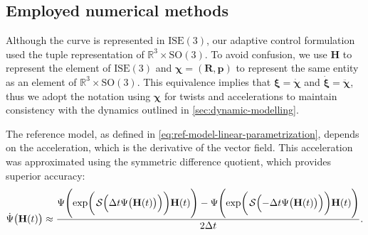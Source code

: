 \subsection{Employed numerical methods}\label{sec:results-adaptive-nummerical-methods}
Although the curve is represented in $\text{ISE}(3)$, our adaptive control formulation used the tuple representation of $\mathbb{R}^3\times \text{SO}(3)$. To avoid confusion, we use $\mathbf{H}$ to represent the element of $\text{ISE}(3)$ and $\boldsymbol{\chi}=(\mathbf{R}, \mathbf{p})$ to represent the same entity as an element of $\mathbb{R}^3\times \text{SO}(3)$. This equivalence implies that $\boldsymbol{\xi}=\dot{\boldsymbol{\chi}}$ and $\dot{\boldsymbol{\xi}} = \ddot{\boldsymbol{\chi}}$, thus we adopt the notation using $\boldsymbol{\chi}$ for twists and accelerations to maintain consistency with the dynamics outlined in \cref{sec:dynamic-modelling}.

The reference model, as defined in \eqref{eq:ref-model-linear-parametrization}, depends on the acceleration, which is the derivative of the vector field. This acceleration was approximated using the symmetric difference quotient, which provides superior accuracy: 
\begin{align}
    \dot{\Psi}\bigl(\mathbf{H}(t)\bigr) \approx \frac{\Psi\Biggl(\exp\biggl(\SL\Bigl(\Delta t\Psi\bigl(\mathbf{H}(t)\bigr)\Bigr)\biggr)\mathbf{H}(t)\Biggr) - \Psi\Biggl(\exp\biggl(\SL\Bigl(-\Delta t\Psi\bigl(\mathbf{H}(t)\bigr)\Bigr)\biggr)\mathbf{H}(t)\Biggr)}{2\Delta t}. \label{eq:approximation-derivative-psi}
\end{align}

